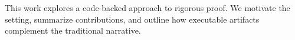 This work explores a code-backed approach to rigorous proof. We motivate the setting, summarize contributions, and outline how executable artifacts complement the traditional narrative.

